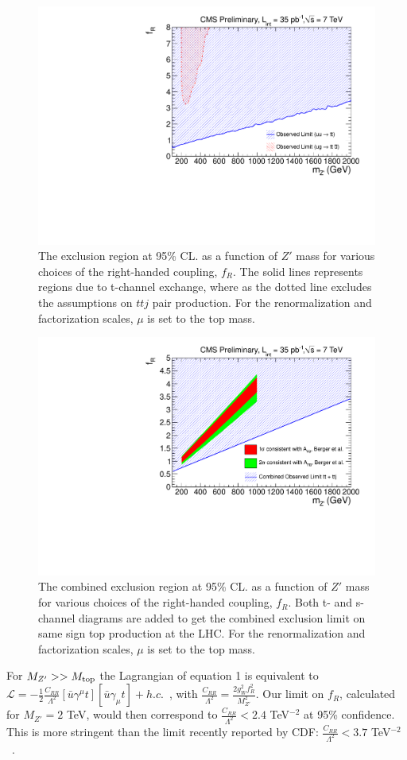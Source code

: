 \begin{figure}[htb]
\begin{center}
\includegraphics[width=0.7\linewidth]{figs/sstop_result.pdf}
\caption{ The exclusion region at 95\% CL. as a function of $Z'$ mass for various choices of the 
right-handed coupling, $f_R$. The solid lines represents regions due to t-channel exchange, where
as the dotted line excludes the assumptions on $ttj$ pair production. For the renormalization and factorization 
scales, $\mu$ is set to the top mass. \label{fig:sstopexclusion}}
\end{center}
\end{figure}

\begin{figure}[htb]
\begin{center}
\includegraphics[width=0.7\linewidth]{figs/sscomb.pdf}
\caption{ The combined exclusion region at 95\% CL. as a function of $Z'$ mass for various choices of the 
right-handed coupling, $f_R$. Both t- and s-channel diagrams are added to get the combined exclusion limit
on same sign top production at the LHC. For the renormalization and factorization 
scales, $\mu$ is set to the top mass. \label{fig:sstopcombexclusion}}
\end{center}
\end{figure}



For $M_{Z'} >> M_{\rm top}$ the Lagrangian of equation 1 is 
equivalent to 
$\mathcal{L} = -\frac{1}{2}\frac{C_{RR}}{\Lambda^2}
 [\bar{u} \gamma^\mu t][\bar{u} \gamma_{\mu} t] + h.c.$~\cite{cdfth2},
with $\frac{C_{RR}}{\Lambda^2} = \frac{2 g_W^2 f_R^2}{M_{Z'}^2}$.
 Our limit on $f_R$, calculated for $M_{Z'}=2$ TeV, 
would then correspond to $\frac{C_{RR}}{\Lambda^2} < 2.4$ TeV$^{-2}$ at 
95\% confidence.  This is more stringent than the limit recently reported
by CDF: $\frac{C_{RR}}{\Lambda^2} < 3.7$ TeV$^{-2}$~\cite{cdflimit}.